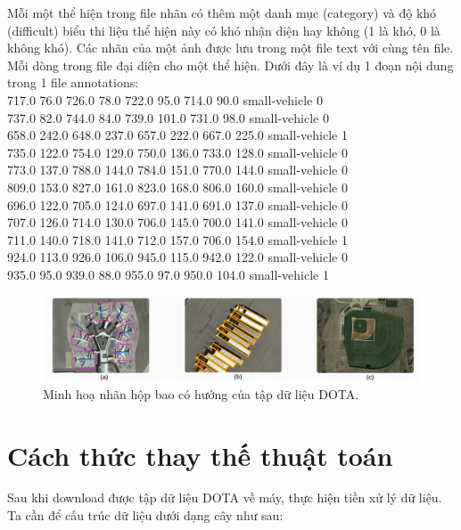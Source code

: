 \documentclass[12pt,a4paper,openany,oneside]{report}
\begin{document}
Mỗi một thể hiện trong file nhãn có thêm một danh mục (category) và độ khó (difficult) biểu thi liệu thể hiện này có khó nhận diện hay không (1 là khó, 0 là không khó). Các nhãn của một ảnh được lưu trong một file text với cùng tên file. Mỗi dòng trong file đại diện cho một thể hiện. Dưới đây là ví dụ 1 đoạn nội dung trong 1 file annotations:\\
717.0 76.0 726.0 78.0 722.0 95.0 714.0 90.0 small-vehicle 0  \\
737.0 82.0 744.0 84.0 739.0 101.0 731.0 98.0 small-vehicle 0 \\
658.0 242.0 648.0 237.0 657.0 222.0 667.0 225.0 small-vehicle 1 \\
735.0 122.0 754.0 129.0 750.0 136.0 733.0 128.0 small-vehicle 0 \\
773.0 137.0 788.0 144.0 784.0 151.0 770.0 144.0 small-vehicle 0 \\
809.0 153.0 827.0 161.0 823.0 168.0 806.0 160.0 small-vehicle 0 \\
696.0 122.0 705.0 124.0 697.0 141.0 691.0 137.0 small-vehicle 0 \\
707.0 126.0 714.0 130.0 706.0 145.0 700.0 141.0 small-vehicle 0 \\
711.0 140.0 718.0 141.0 712.0 157.0 706.0 154.0 small-vehicle 1 \\
924.0 113.0 926.0 106.0 945.0 115.0 942.0 122.0 small-vehicle 0 \\
935.0 95.0 939.0 88.0 955.0 97.0 950.0 104.0 small-vehicle 1 \\

\begin{figure}[ht!]
	\begin{center}
		\includegraphics[width=445px]{./minh_hoa_hop_bao_dota.jpg}
		\caption{Minh hoạ nhãn hộp bao có hướng của tập dữ liệu DOTA.}
		\label{minh_hoa_hop_bao_dota}
	\end{center}
\end{figure} 
\section{Cách thức thay thế thuật toán}

Sau khi download được tập dữ liệu DOTA về máy, thực hiện tiền xử lý dữ liệu. Ta cần để cấu trúc dữ liệu dưới dạng cây như sau:
\end{document}
